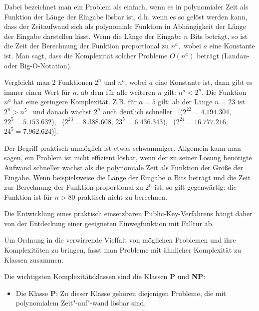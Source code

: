 \begin{refsegment}
Dabei bezeichnet man ein Problem als \glqq einfach\grqq, wenn es in   polynomialer Zeit als Funktion der Länge der Eingabe lösbar ist, d.h. wenn es so gelöst werden kann, dass der Zeitaufwand sich als polynomiale Funktion in Abhängigkeit der Länge der Eingabe darstellen lässt.
Wenn die Länge der Eingabe $ n $ Bits beträgt, so ist die Zeit der Berechnung der Funktion proportional zu $ n^{a}, $ wobei $ a $  eine Konstante ist. Man sagt, dass die  Komplexität solcher Probleme $ O(n^{a}) $ beträgt (Landau- oder Big-O-Notation).

Vergleicht man 2 Funktionen  $ 2^n $  und   $ n^{a} $, wobei $ a $
eine Konstante ist, dann gibt es immer einen Wert für  $ n $, ab dem
für alle weiteren $ n $ gilt: $ n^{a}  <  2^n $.
Die Funktion  $ n^{a} $  hat eine geringere Komplexität.
Z.B. für $ a=5 $ gilt: ab der Länge $ n=23 $ ist
$ 2^n > n^5 $ ~\mbox{und} danach wächst $ 2^n $ auch deutlich
schneller \
[($ 2^{22}= 4.194.304 $, $ 22^5= 5.153.632 $), \
 ($ 2^{23}= 8.388.608 $, $ 23^5= 6.436.343 $), \
 ($ 2^{24}=16.777.216 $, $ 24^5= 7.962.624 $)].\par

Der Begriff \glqq praktisch unmöglich\grqq {} ist etwas schwammiger.
Allgemein kann man sagen, ein Problem ist 
nicht effizient lösbar, wenn der zu seiner Lösung benötigte Aufwand
schneller wächst als die polynomiale \index{Polynom} Zeit als Funktion der Größe der
Eingabe. Wenn beispielsweise die Länge der Eingabe $ n $  Bits beträgt
und die Zeit zur Berechnung der Funktion proportional zu $ 2^n $ ist,
so gilt gegenwärtig: die Funktion ist für $n > 80$ praktisch nicht zu
berechnen.

Die Entwicklung eines praktisch einsetzbaren Public-Key-Verfahrens hängt daher von der Entdeckung einer geeigneten Einwegfunktion mit Falltür ab.\par

Um Ordnung in die verwirrende Vielfalt von möglichen Problemen und ihre Komplexitäten zu bringen, fasst man Probleme mit ähnlicher Komplexität zu Klassen zusammen.

Die wichtigsten Komplexitätsklassen  sind die Klassen \textbf{P} und \textbf{NP}:

\begin{itemize}
    \item Die Klasse \textbf{P}: Zu dieser Klasse gehören diejenigen Probleme, die mit polynomialem  Zeit"-auf"-wand lösbar sind.


\end{itemize}
\end{refsegment}
